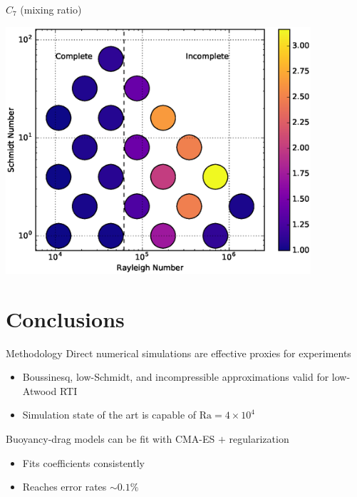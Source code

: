 \documentclass[12pt]{beamer}
\begin{document}
\begin{frame}[t]{$C_7$ (mixing ratio)}
\begin{center}
\vspace{-11pt}
\includegraphics[width=0.85\textwidth]{graphics/C7-vs-Rayleigh-Schmidt.eps}
\end{center}
\end{frame}

\section{Conclusions}
\begin{frame}{Methodology}
Direct numerical simulations are effective proxies for experiments
\begin{itemize}
  \item Boussinesq, low-Schmidt, and incompressible approximations valid for low-Atwood RTI
  \item Simulation state of the art is capable of $\text{Ra} = 4 \times 10^{4}$
\end{itemize}
\vspace{10pt} \pause

Buoyancy-drag models can be fit with CMA-ES $+$ regularization
\begin{itemize}
  \item Fits coefficients consistently
  \item Reaches error rates $\sim 0.1 \%$
\end{itemize}
\end{frame}
\end{document}
